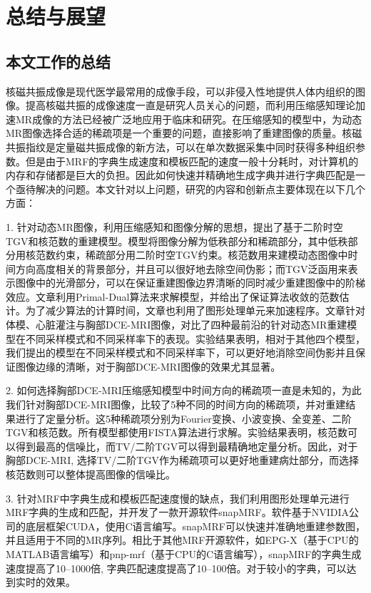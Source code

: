\chapter{总结与展望}
\label{chap:future}

\section{本文工作的总结}
核磁共振成像是现代医学最常用的成像手段，可以非侵入性地提供人体内组织的图像。提高核磁共振的成像速度一直是研究人员关心的问题，而利用压缩感知理论加速MR成像的方法已经被广泛地应用于临床和研究。在压缩感知的模型中，为动态MR图像选择合适的稀疏项是一个重要的问题，直接影响了重建图像的质量。核磁共振指纹是定量磁共振成像的新方法，可以在单次数据采集中同时获得多种组织参数。但是由于MRF的字典生成速度和模板匹配的速度一般十分耗时，对计算机的内存和存储都是巨大的负担。因此如何快速并精确地生成字典并进行字典匹配是一个亟待解决的问题。本文针对以上问题，研究的内容和创新点主要体现在以下几个方面：

1. 针对动态MR图像，利用压缩感知和图像分解的思想，提出了基于二阶时空TGV和核范数的重建模型。模型将图像分解为低秩部分和稀疏部分，其中低秩部分用核范数约束，稀疏部分用二阶时空TGV约束。核范数用来建模动态图像中时间方向高度相关的背景部分，并且可以很好地去除空间伪影；而TGV泛函用来表示图像中的光滑部分，可以在保证重建图像边界清晰的同时减少重建图像中的阶梯效应。文章利用Primal-Dual算法来求解模型，并给出了保证算法收敛的范数估计。为了减少算法的计算时间，文章也利用了图形处理单元来加速程序。文章针对体模、心脏灌注与胸部DCE-MRI图像，对比了四种最前沿的针对动态MR重建模型在不同采样模式和不同采样率下的表现。实验结果表明，相对于其他四个模型，我们提出的模型在不同采样模式和不同采样率下，可以更好地消除空间伪影并且保证图像边缘的清晰，对于胸部DCE-MRI图像的效果尤其显著。

2. 如何选择胸部DCE-MRI压缩感知模型中时间方向的稀疏项一直是未知的，为此我们针对胸部DCE-MRI图像，比较了5种不同的时间方向的稀疏项，并对重建结果进行了定量分析。这5种稀疏项分别为Fourier变换、小波变换、全变差、二阶TGV和核范数。所有模型都使用FISTA算法进行求解。实验结果表明，核范数可以得到最高的信噪比，而TV/二阶TGV可以得到最精确地定量分析。因此，对于胸部DCE-MRI, 选择TV/二阶TGV作为稀疏项可以更好地重建病灶部分，而选择核范数则可以整体提高图像的信噪比。

3. 针对MRF中字典生成和模板匹配速度慢的缺点，我们利用图形处理单元进行MRF字典的生成和匹配，并开发了一款开源软件snapMRF。软件基于NVIDIA公司的底层框架CUDA，使用C语言编写。snapMRF可以快速并准确地重建参数图，并且适用于不同的MR序列。相比于其他MRF开源软件，如EPG-X（基于CPU的MATLAB语言编写）和pnp-mrf（基于CPU的C语言编写），snapMRF的字典生成速度提高了10--1000倍, 字典匹配速度提高了10--100倍。对于较小的字典，可以达到实时的效果。

